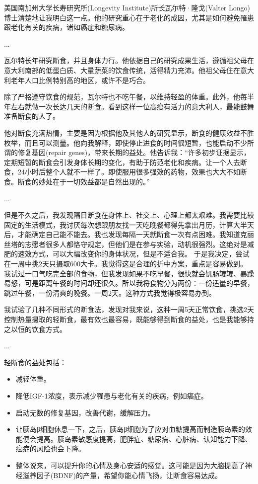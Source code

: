 \documentclass[12pt,oneside]{book}
\begin{document}
\begin{bookref}[frametitle={\cite{轻断食}}]

美国南加州大学长寿研究所(Longevity Institute)所长瓦尔特·隆戈(Valter Longo)博士清楚地让我明白这一点。他的研究重心在于老化的成因，尤其是如何避免罹患跟老化有关的疾病，诸如癌症和糖尿病。

...

瓦尔特长年研究断食，并且身体力行。他依据自己的研究成果生活，遵循祖父母在意大利南部的低蛋白质、大量蔬菜的饮食传统，活得精力充沛。他祖父母住在意大利老年人口比例特别高的地区，或许不是巧合。

除了严格遵守饮食的规范，瓦尔特也不吃午餐，以维持轻盈的体重。此外，他每半年左右就做一次长达几天的断食。看到这样一位高瘦有活力的意大利人，最能鼓舞准备断食的人了。

他对断食充满热情，主要是因为根据他及其他人的研究显示，断食的健康效益不胜枚举，而且可以测量。他向我解释，即使停止进食的时间很短暂，也能启动不少所谓的修复基因(repair genes)，带来长期的益处。他告诉我：“许多初步证据显示，定期短暂的断食会引发身体长期的变化，有助于防范老化和疾病。让一个人去断食，24小时后整个人就不一样了。即使服用很多强效的药物，效果也大大不如断食。断食的妙处在于一切效益都是自然出现的。”

...

但是不久之后，我发现隔日断食在身体上、社交上、心理上都太艰难。我需要比较固定的生活模式，我讨厌每次想跟朋友找一天吃晚餐都得先拿出月历，计算大半天后，才能确定自己能不能去。我也发现每隔一天就断食一次有点困难。我知道克丽丝塔的志愿者很多人都恪守规定，但他们是在参与实验，动机很强烈。这绝对是减肥的速效方式，可以大幅改变你的身体状况，但是不适合我。
于是我决定，尝试在一周中挑2天只摄取600大卡。我觉得这是合理的折中方案，重点是容易做到。
我试过一口气吃完全部的食物，但我发现如果不吃早餐，很快就会饥肠辘辘、暴躁易怒，可是距离午餐的时间却还很久。所以我将食物分为两份：一份适量的早餐，跳过午餐，一份清爽的晚餐。一周2天。这种方式我觉得极容易办到。

我试验了几种不同形式的断食法，发现对我来说，这种一周5天正常饮食，挑选2天控制热量摄取的轻断食，最有效也最容易，既能够得到断食的益处，也是我能够持之以恒的饮食方式。

...

轻断食的益处包括：

\begin{itemize}
\item 减轻体重。
\item 降低IGF-1浓度，表示减少罹患与老化有关的疾病，例如癌症。
\item 启动无数的修复基因，改善代谢，缓解压力。
\item 让胰岛β细胞休息一下，之后，胰岛β细胞为了应对血糖提高而制造胰岛素的效能便会提高。胰岛素敏感度提高，肥胖症、糖尿病、心脏病、认知能力下降、癌症的风险也会下降。
\item 整体说来，可以提升你的心情及身心安适的感觉。这可能是因为大脑提高了神经滋养因子(BDNF)的产量，希望你能心情飞扬，让断食容易达成。



\end{itemize}
\end{bookref}
\end{document}
